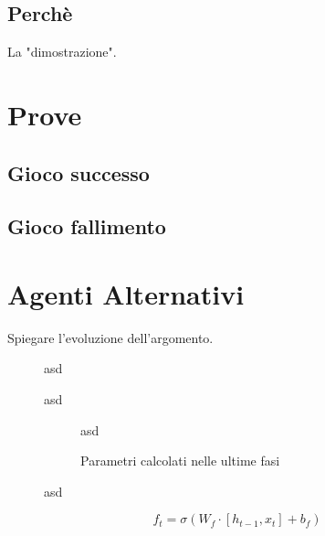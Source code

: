 \documentclass[twoside,twocolumn,10pt]{extarticle}
\theoremstyle{definition}
\begin{document}
	
	\subsection{Perchè}
		La "dimostrazione".
		
\section{Prove}
	\subsection{Gioco successo}
	
	\subsection{Gioco fallimento}
		
\section{Agenti Alternativi}\label{}
	Spiegare l'evoluzione dell'argomento.

	\begin{figure}[h]
		\centering
		\caption{asd}
		\label{fig:unroll}
	\end{figure}

	\begin{figure}[h]
		\centering
		\caption{asd}
		\label{fig:lstm}
	\end{figure}

	\begin{figure}[h]
		\centering
		\begin{subfigure}[b]{.496\textwidth}
			\caption{asd}
		\end{subfigure}
		\begin{subfigure}[b]{.496\textwidth}
			\caption{Parametri calcolati nelle ultime fasi}
		\end{subfigure}
		\caption{asd}
		\label{fig:parmap}
	\end{figure}
	
	\begin{equation}\label{eq:ft}
		f_t = \sigma(W_f \cdot [h_{t - 1}, x_t] + b_f)
	\end{equation}
	
\end{document}

